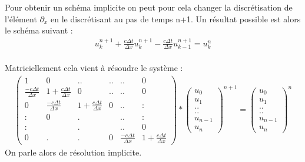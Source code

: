 \documentclass[12pt]{article}
\begin{document}
\noindent Pour obtenir un schéma implicite on peut pour cela changer la discrétisation de l'élément $\partial_x$ en le discrétisant au pas de temps n+1. 
Un résultat possible est alors le schéma suivant :
\begin{eqnarray}
         u_k^{n+1} +\frac{c\Delta t}{\Delta x}u_k^{n+1}-\frac{c\Delta t}{\Delta x}u_{k-1}^{n+1}=u_k^n
\end{eqnarray}
\\Matriciellement cela vient à résoudre le système :
\begin{eqnarray}
        \begin{pmatrix}
   1 & 0 & .. & .. &.. & 0 \\
   \frac{-c\Delta t}{\Delta x} & 1 + \frac{c\Delta t}{\Delta x} &0 &..&.. &0 \\
   0 & \frac{-c\Delta t}{\Delta x} & 1 + \frac{c\Delta t}{\Delta x} & 0 &.. & : \\
   : & 0 & . &  &.. & : \\
   : &  & . &  &.. & 0 \\
   0 & . & . & 0 &\frac{-c\Delta t}{\Delta x} & 1 + \frac{c\Delta t}{\Delta x}
   
\end{pmatrix}
*         \begin{pmatrix}
  u_0\\
  u_1\\
  ..\\
  ..\\
  u_{n-1}\\
  u_n
\end{pmatrix}^{n+1}
= \begin{pmatrix}
  u_0\\
  u_1\\
  ..\\
  ..\\
  u_{n-1}\\
  u_n
\end{pmatrix}^n
\end{eqnarray}
On parle alors de résolution implicite.
\end{document}
